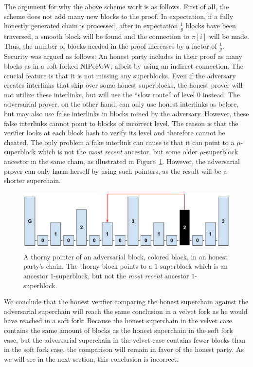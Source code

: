 The argument for why the above scheme work is as follows. First of all, the
scheme does not add many new blocks to the proof. In expectation, if a fully
honestly generated chain is processed, after in expectation $\frac{1}{g}$ blocks
have been traversed, a smooth block will be found and the connection to $\pi[i]$
will be made. Thus, the number of blocks needed in the proof increases by a
factor of $\frac{1}{g}$. Security was argued as follows: An honest party
includes in their proof as many blocks as in a soft forked NIPoPoW, albeit by
using an indirect connection. The crucial feature is that it is not missing any
superblocks. Even if the adversary creates interlinks that skip over some honest
superblocks, the honest prover will not utilize these interlinks, but will use
the ``slow route'' of level $0$ instead. The adversarial prover, on the other
hand, can only use honest interlinks as before, but may also use false
interlinks in blocks mined by the adversary. However, these false
interlinks cannot point to blocks of incorrect level. The reason is
that the verifier looks at each block hash to verify its level and
therefore cannot be cheated. The only problem a fake interlink can cause is that
it can point to a $\mu$-superblock which is not the \emph{most recent} ancestor,
but some older $\mu$-superblock ancestor in the same chain,
as illustrated in Figure~\ref{fig:skip_ancestor}. However, the adversarial
prover can only harm herself by using such pointers, as the result will
be a shorter superchain.

\begin{figure}
	\begin{center}
		\includegraphics[width=0.8\columnwidth]{figures/simple_thorny.pdf}
	\end{center}
    \caption{A thorny pointer of an adversarial block, colored black, in an honest party's chain. The thorny block points to a $1$-superblock which is an ancestor
		$1$-superblock, but not the \emph{most recent} ancestor $1$-superblock.}
	\label{fig:skip_ancestor}
\end{figure}

We conclude that the honest verifier comparing the honest superchain
against the adversarial superchain will reach the same conclusion in a velvet
fork as he would have reached in a soft fork: Because the honest
superchain in the velvet case contains the same amount of blocks as the honest
superchain in the soft fork case, but the adversarial superchain in the velvet
case contains fewer blocks than in the soft fork case, the comparison will
remain in favor of the honest party. As we will see in the next section, this
conclusion is incorrect.
